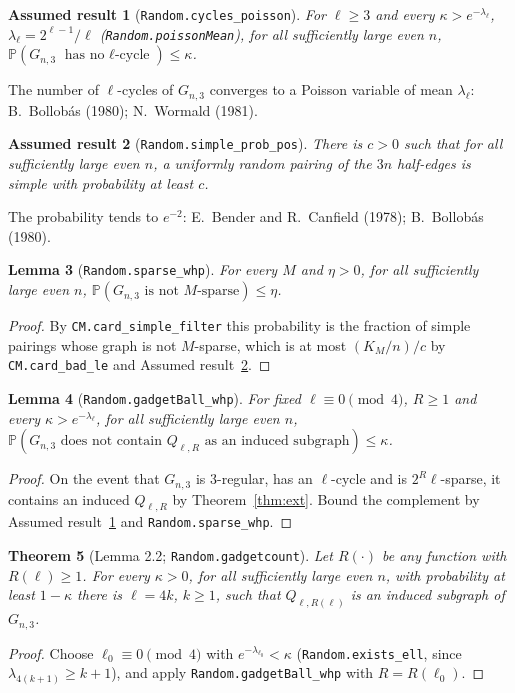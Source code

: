 \documentclass[11pt]{amsart}
\newcommand{\leanname}[1]{\texttt{\textcolor{black!75}{#1}}}
\newcommand{\PP}{\mathbb{P}}
\newcommand{\Q}{Q_{\ell,R}}
\newcommand{\Gnt}{G_{n,3}}
\theoremstyle{plain}
\newtheorem{theorem}{Theorem}[section]
\newtheorem{lemma}[theorem]{Lemma}
\newtheorem{axiom}[theorem]{Assumed result}
\theoremstyle{definition}
\theoremstyle{remark}
\begin{document}
\begin{axiom}[\leanname{Random.cycles\_poisson}]\label{ax:cycles}
For $\ell\ge3$ and every $\kappa>e^{-\lambda_\ell}$, $\lambda_\ell=2^{\ell-1}/\ell$
(\leanname{Random.poissonMean}), for all sufficiently large even $n$,
$\PP(\Gnt\text{ has no $\ell$-cycle})\le\kappa$.
\end{axiom}
\noindent The number of $\ell$-cycles of $\Gnt$ converges to a Poisson variable of mean
$\lambda_\ell$: B.~Bollob\'as (1980); N.~Wormald (1981).

\begin{axiom}[\leanname{Random.simple\_prob\_pos}]\label{ax:simple}
There is $c>0$ such that for all sufficiently large even $n$, a uniformly random pairing of the
$3n$ half-edges is simple with probability at least $c$.
\end{axiom}
\noindent The probability tends to $e^{-2}$: E.~Bender and R.~Canfield (1978); B.~Bollob\'as
(1980).

\begin{lemma}[\leanname{Random.sparse\_whp}]
For every $M$ and $\eta>0$, for all sufficiently large even $n$,
$\PP(\Gnt\text{ is not $M$-sparse})\le\eta$.
\end{lemma}
\begin{proof}
By \leanname{CM.card\_simple\_filter} this probability is the fraction of simple pairings whose
graph is not $M$-sparse, which is at most $(K_M/n)/c$ by \leanname{CM.card\_bad\_le} and
Assumed result~\ref{ax:simple}.
\end{proof}

\begin{lemma}[\leanname{Random.gadgetBall\_whp}]
For fixed $\ell\equiv0\pmod4$, $R\ge1$ and every $\kappa>e^{-\lambda_\ell}$, for all sufficiently
large even $n$, $\PP(\Gnt\text{ does not contain $\Q$ as an induced subgraph})\le\kappa$.
\end{lemma}
\begin{proof}
On the event that $\Gnt$ is $3$-regular, has an $\ell$-cycle and is $2^R\ell$-sparse, it contains
an induced $\Q$ by Theorem~\ref{thm:ext}. Bound the complement by Assumed
result~\ref{ax:cycles} and \leanname{Random.sparse\_whp}.
\end{proof}

\begin{theorem}[Lemma 2.2; \leanname{Random.gadgetcount}]
Let $R(\cdot)$ be any function with $R(\ell)\ge1$. For every $\kappa>0$, for all sufficiently large
even $n$, with probability at least $1-\kappa$ there is $\ell=4k$, $k\ge1$, such that
$Q_{\ell,R(\ell)}$ is an induced subgraph of $\Gnt$.
\end{theorem}
\begin{proof}
Choose $\ell_0\equiv0\pmod4$ with $e^{-\lambda_{\ell_0}}<\kappa$ (\leanname{Random.exists\_ell}, since
$\lambda_{4(k+1)}\ge k+1$), and apply \leanname{Random.gadgetBall\_whp} with $R=R(\ell_0)$.
\end{proof}
\end{document}
